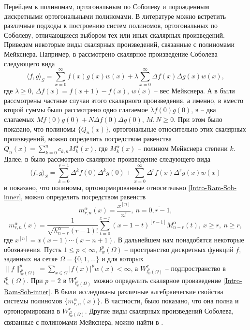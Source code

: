 Перейдем к полиномам, ортогональным по Соболеву и порожденным дискретными ортогональными полиномами. В литературе можно встретить различные подходы к построению систем полиномов, ортогональных по Соболеву, отличающиеся выбором тех или иных скалярных произведений. Приведем некоторые виды скалярных произведений, связанные с полиномами Мейкснера. Например, в \cite{Ram-Ar-Go-Mar,Ram-Kh-Old} рассмотрено скалярное произведение Соболева следующего вида
$$
\langle f,g\rangle_S=\sum_{x=0}^{\infty}f(x)g(x)w(x)+\lambda\sum_{x=0}^{\infty}\Delta f(x)\Delta g(x)w(x),
$$
где $\lambda\ge 0$, $\Delta f(x)=f(x+1)-f(x)$, $w(x)$ -- вес Мейкснера. А в \cite{Ram-Bav1,Ram-Bav2} были рассмотрены частные случаи этого скалярного произведения, а именно, в \cite{Ram-Bav1} вместо второй суммы было рассмотрено одно слагаемое $\lambda f(0)g(0)$, в \cite{Ram-Bav2} -- два слагаемых $Mf(0)g(0)+N\Delta f(0)\Delta g(0)$, $M,N\ge 0$. При этом было показано, что полиномы $\{Q_n(x)\}$, ортогональные относительно этих скалярных произведений, можно определить посредством равенства $Q_n(x)=\sum_{k=0}^{n}c_{k,n}M_k^\alpha(x)$, где $M_k^\alpha(x)$ -- полином Мейкснера степени $k$. Далее, в \cite{Ram-Shar-VMJ,Ram-Shar-Sar} было рассмотрено скалярное произведение следующего вида
\begin{equation}\label{Intro-Ram-Sob-inner}
\langle f,g\rangle_S=\sum_{k=0}^{r-1}\Delta^kf(0)\Delta^kg(0)+\sum_{x=0}^\infty\Delta^rf(x)\Delta^rg(x)w(x)
\end{equation}
и показано, что полиномы, ортонормированные относительно \eqref{Intro-Ram-Sob-inner}, можно определить посредством равенств
$$
m_{r,n}^{\alpha}(x)=\frac{x^{[n]}}{n!},\ n=\overline{0,r-1},
$$
$$
m_{r,n}^{\alpha}(x)=
\frac{1}{\sqrt{h_{n-r}^\alpha}(r-1)!}\sum_{t=0}^{x-r}(x-1-t)^{[r-1]}M_{n-r}^\alpha(t),\ x\ge r,\ n\ge r,
$$
где $x^{[n]}=x(x-1)\cdots(x-n+1)$.
В дальнейшем нам понадобятся некоторые обозначения. Пусть $1\le p<\infty$, $l_w^p(\Omega)$ -- пространство дискретных функций $f$, заданных на сетке $\Omega=\{0, 1, \ldots\}$ и для которых $\|f\|_{l_{w}^p(\Omega)}^p=\sum_{x\in\Omega}|f(x)|^pw(x)<\infty$, а $W^r_{l_{w}^p(\Omega)}$ -- подпространство в $l_{w}^p(\Omega)$. При $p=2$ в $W^r_{l_{w}^p(\Omega)}$ можно определить скалярное произведение \eqref{Intro-Ram-Sob-inner}.
В \cite{Ram-Shar-Sar} были исследованы различные алгебраические свойства системы полиномов $\{m_{r,n}^{\alpha}(x)\}$. В частности, было показано, что она полна и ортонормирована в $W^r_{l_w^2(\Omega)}$.
Другие виды скалярных произведений Соболева, связанные с полиномами Мейкснера, можно найти в \cite{Ram-Mor-Bal,Ram-Co-So-Vil}.
